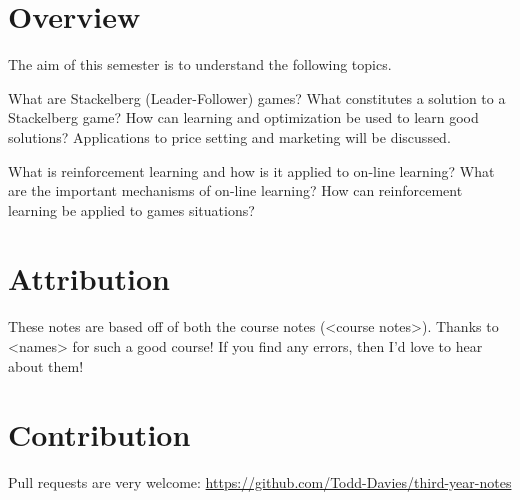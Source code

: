 \section*{Overview}

The aim of this semester is to understand the following topics.

What are Stackelberg (Leader-Follower) games? What constitutes a solution to a
Stackelberg game? How can learning and optimization be used to learn good
solutions? Applications to price setting and marketing will be discussed.

What is reinforcement learning and how is it applied to on-line learning? What
are the important mechanisms of on-line learning? How can reinforcement learning
be applied to games situations?

\section*{Attribution}

These notes are based off of both the course notes (<course notes>). Thanks to
<names> for such a good course! If you find any errors, then I'd love to hear
about them!

\section*{Contribution}

Pull requests are very welcome:
\url{https://github.com/Todd-Davies/third-year-notes}